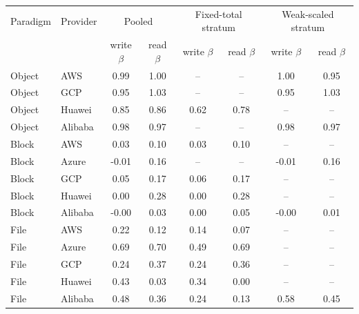 \begin{tabular}{llcccccc}
\toprule
Paradigm & Provider & \multicolumn{2}{c}{Pooled} & \multicolumn{2}{c}{Fixed-total stratum} & \multicolumn{2}{c}{Weak-scaled stratum} \\
 & & write $\beta$ & read $\beta$ & write $\beta$ & read $\beta$ & write $\beta$ & read $\beta$ \\
\midrule
Object & AWS & 0.99 & 1.00 & -- & -- & 1.00 & 0.95 \\
Object & GCP & 0.95 & 1.03 & -- & -- & 0.95 & 1.03 \\
Object & Huawei & 0.85 & 0.86 & 0.62 & 0.78 & -- & -- \\
Object & Alibaba & 0.98 & 0.97 & -- & -- & 0.98 & 0.97 \\
\midrule
Block & AWS & 0.03 & 0.10 & 0.03 & 0.10 & -- & -- \\
Block & Azure & -0.01 & 0.16 & -- & -- & -0.01 & 0.16 \\
Block & GCP & 0.05 & 0.17 & 0.06 & 0.17 & -- & -- \\
Block & Huawei & 0.00 & 0.28 & 0.00 & 0.28 & -- & -- \\
Block & Alibaba & -0.00 & 0.03 & 0.00 & 0.05 & -0.00 & 0.01 \\
\midrule
File & AWS & 0.22 & 0.12 & 0.14 & 0.07 & -- & -- \\
File & Azure & 0.69 & 0.70 & 0.49 & 0.69 & -- & -- \\
File & GCP & 0.24 & 0.37 & 0.24 & 0.36 & -- & -- \\
File & Huawei & 0.43 & 0.03 & 0.34 & 0.00 & -- & -- \\
File & Alibaba & 0.48 & 0.36 & 0.24 & 0.13 & 0.58 & 0.45 \\
\bottomrule
\end{tabular}
